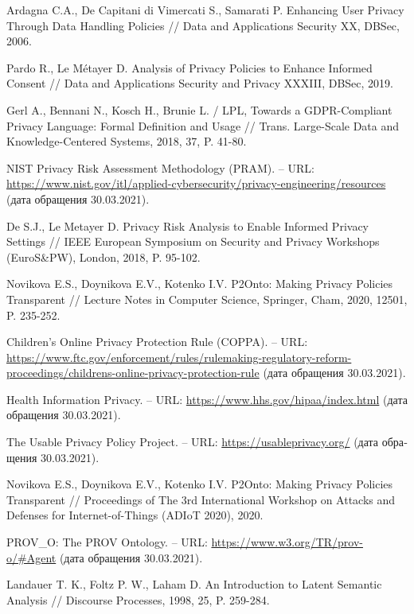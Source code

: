 \documentclass[../main]{subfiles}
\begin{document}
\begin{english}
\begin{biblenum}
     Ardagna C.A., De Capitani di Vimercati S., Samarati P. Enhancing User Privacy Through Data Handling Policies // Data and Applications Security XX, DBSec, 2006. 

     Pardo R., Le Métayer D. Analysis of Privacy Policies to Enhance Informed Consent // Data and Applications Security and Privacy XXXIII, DBSec, 2019. 

     Gerl A., Bennani N., Kosch H., Brunie L. / LPL, Towards a GDPR-Compliant Privacy Language: Formal Definition and Usage // Trans. Large-Scale Data and Knowledge-Centered Systems, 2018, 37, P. 41-80. 

     NIST Privacy Risk Assessment Methodology (PRAM). -- URL: \url{https://www.nist.gov/itl/applied-cybersecurity/privacy-engineering/resources} (\textrussian{дата обращения} 30.03.2021).

     De S.J., Le Metayer D.  Privacy Risk Analysis to Enable Informed Privacy Settings // IEEE European Symposium on Security and Privacy Workshops (EuroS\&PW), London, 2018, P. 95-102. 

     Novikova E.S., Doynikova E.V., Kotenko I.V. P2Onto: Making Privacy Policies Transparent // Lecture Notes in Computer Science, Springer, Cham, 2020, 12501, P. 235-252.

     Children's Online Privacy Protection Rule (COPPA). -- URL: \url{https://www.ftc.gov/enforcement/rules/rulemaking-regulatory-reform-proceedings/childrens-online-privacy-protection-rule} (\textrussian{дата обращения} 30.03.2021). 

     Health Information Privacy. -- URL: \url{https://www.hhs.gov/hipaa/index.html} (\textrussian{дата обращения} 30.03.2021).

     The Usable Privacy Policy Project. -- URL: \url{https://usableprivacy.org/} (\textrussian{дата обращения} 30.03.2021).

     Novikova E.S., Doynikova E.V., Kotenko I.V. P2Onto: Making Privacy Policies Transparent // Proceedings of The 3rd International Workshop on Attacks and Defenses for Internet-of-Things (ADIoT 2020), 2020.

     PROV\_O: The PROV Ontology. -- URL: \url{https://www.w3.org/TR/prov-o/#Agent} (\textrussian{дата обращения} 30.03.2021).

     Landauer T. K., Foltz P. W., Laham D. An Introduction to Latent Semantic Analysis // Discourse Processes, 1998, 25, P. 259-284.


\end{biblenum}
\end{english}
\end{document}
